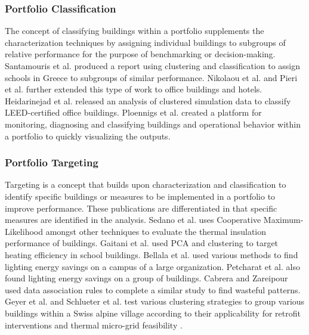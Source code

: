 \subsubsection{Portfolio Classification}
The concept of classifying buildings within a portfolio supplements the characterization techniques by assigning individual buildings to subgroups of relative performance for the purpose of benchmarking or decision-making. Santamouris et al. \cite{santamouris_using_2007} produced a report using clustering and classification to assign schools in Greece to subgroups of similar performance. Nikolaou et al. \cite{nikolaou_application_2012} and Pieri et al. \cite{pieri_identifying_2015} further extended this type of work to office buildings and hotels. Heidarinejad et al. \cite{heidarinejad_cluster_2014} released an analysis of clustered simulation data to classify LEED-certified office buildings. Ploennigs et al. \cite{ploennigs_e2-diagnoser:_2014} created a platform for monitoring, diagnosing and classifying buildings and operational behavior within a portfolio to quickly visualizing the outputs.

\subsubsection{Portfolio Targeting}
Targeting is a concept that builds upon characterization and classification to identify specific buildings or measures to be implemented in a portfolio to improve performance. These publications are differentiated in that specific measures are identified in the analysis. Sedano et al. \cite{sedano_improving_2009} uses Cooperative Maximum-Likelihood amongst other techniques to evaluate the thermal insulation performance of buildings. Gaitani et al. \cite{gaitani_using_2010} used PCA and clustering to target heating efficiency in school buildings. Bellala et al. \cite{bellala_towards_2011} used various methods to find lighting energy savings on a campus of a large organization. Petcharat et al. \cite{petcharat_assessment_2012} also found lighting energy savings on a group of buildings. Cabrera and Zareipour \cite{cabrera_data_2013} used data association rules to complete a similar study to find wasteful patterns. Geyer et al.  and Schlueter et al. test various clustering strategies to group various buildings within a Swiss alpine village according to their applicability for retrofit interventions \cite{geyer_application_2016} and thermal micro-grid feasibility \cite{schlueter_analysis_2016}.

